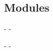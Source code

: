 \subsection{Modules\label{modules}}%
\begin{description}\kern-\topsep
\makeatletter\advance\@topsepadd-\topsep\makeatother%
\item[{\hyperref[Markup-X]{\ocamlinlinecode{\ocamlinlinecode{X}}[p\pageref*{Markup-X}]}}]{}\end{description}%
\begin{description}\kern-\topsep
\makeatletter\advance\@topsepadd-\topsep\makeatother%
\item[{\hyperref[Markup-X]{\ocamlinlinecode{\ocamlinlinecode{X}}[p\pageref*{Markup-X}]}}]{}%
\item[{\hyperref[Markup-Y]{\ocamlinlinecode{\ocamlinlinecode{Y}}[p\pageref*{Markup-Y}]}}]{}\end{description}%
